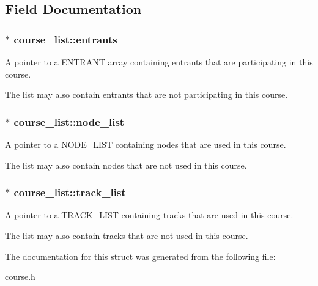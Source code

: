 \subsection{Field Documentation}
\hypertarget{structcourse__list_a4e1346092023718442c7b74cd5b30fa4}{
\subsubsection[{entrants}]{$\ast$ course\-\_\-list\-::entrants}}\label{structcourse__list_a4e1346092023718442c7b74cd5b30fa4}


A pointer to a E\-N\-T\-R\-A\-N\-T array containing entrants that are participating in this course. 

The list may also contain entrants that are not participating in this course. \hypertarget{structcourse__list_a5adfcd18fff8020d1e4c068082a03cba}{
\subsubsection[{node\-\_\-list}]{$\ast$ course\-\_\-list\-::node\-\_\-list}}\label{structcourse__list_a5adfcd18fff8020d1e4c068082a03cba}


A pointer to a N\-O\-D\-E\-\_\-\-L\-I\-S\-T containing nodes that are used in this course. 

The list may also contain nodes that are not used in this course. \hypertarget{structcourse__list_aaad25fce52f3485b94f900248f4fb45b}{
\subsubsection[{track\-\_\-list}]{$\ast$ course\-\_\-list\-::track\-\_\-list}}\label{structcourse__list_aaad25fce52f3485b94f900248f4fb45b}


A pointer to a T\-R\-A\-C\-K\-\_\-\-L\-I\-S\-T containing tracks that are used in this course. 

The list may also contain tracks that are not used in this course. 

The documentation for this struct was generated from the following file\-:\begin{DoxyCompactItemize}
\item 
\hyperlink{course_8h}{course.\-h}\end{DoxyCompactItemize}
